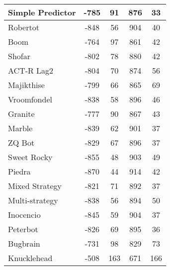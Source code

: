 \begin{table*}
\begin{tabular}{|l|c|c|c|c|}
Simple Predictor & -785 & 91 & 876 & 33 \\ \hline 
Robertot & -848 & 56 & 904 & 40 \\ \hline 
Boom & -764 & 97 & 861 & 42 \\ \hline 
Shofar & -802 & 78 & 880 & 42 \\ \hline 
ACT-R Lag2 & -804 & 70 & 874 & 56 \\ \hline 
Majikthise & -799 & 66 & 865 & 69 \\ \hline 
Vroomfondel & -838 & 58 & 896 & 46 \\ \hline 
Granite & -777 & 90 & 867 & 43 \\ \hline 
Marble & -839 & 62 & 901 & 37 \\ \hline 
ZQ Bot & -829 & 67 & 896 & 37 \\ \hline 
Sweet Rocky & -855 & 48 & 903 & 49 \\ \hline 
Piedra & -870 & 44 & 914 & 42 \\ \hline 
Mixed Strategy & -821 & 71 & 892 & 37 \\ \hline 
Multi-strategy & -838 & 56 & 894 & 50 \\ \hline 
Inocencio & -845 & 59 & 904 & 37 \\ \hline 
Peterbot & -826 & 69 & 895 & 36 \\ \hline 
Bugbrain & -731 & 98 & 829 & 73 \\ \hline 
Knucklehead & -508 & 163 & 671 & 166 \\ \hline
        \end{tabular}
    \end{table*}